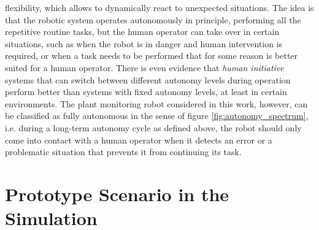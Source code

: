 \documentclass[english, master, utf8]{base/thesis_KBS}
\begin{document}
flexibility, which allows to dynamically react to unexpected situations. \cite{Bresina:2005}
The idea is that the robotic system operates autonomously in principle, performing all the repetitive routine tasks, but the human operator can take over in certain situations,
such as when the robot is in danger and human intervention is required, or when a task needs to be performed that for some reason is better suited for a human operator.
\cite{Kortenkamp:2009} There is even evidence that \textit{human initiative} systems that can switch between different autonomy levels during operation perform better than
systems with fixed autonomy levels, at least in certain environments. \cite{Chiou:2021}
The plant monitoring robot considered in this work, however, can be classified as fully autonomous in the sense of figure \ref{fig:autonomy_spectrum}, 
i.e. during a long-term autonomy cycle as defined above, the robot should only come into contact with a human operator when it detects an error or a problematic situation
that prevents it from continuing its task.

\section{Prototype Scenario in the Simulation}
\label{sec:prototype_scenario}
\end{document}
